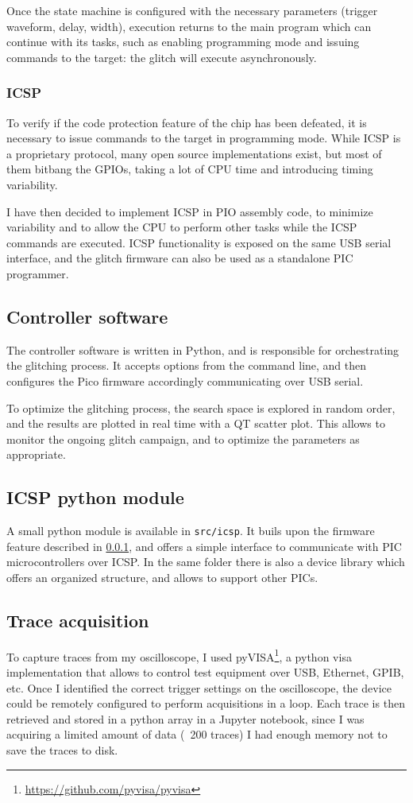 \documentclass[a4paper,english,twoside,10pt]{article}
\begin{document}
Once the state machine is configured with the necessary parameters (trigger waveform, delay, width), execution returns to the main program which can continue with its tasks, such as enabling programming mode and issuing commands to the target: the glitch will execute asynchronously.

\subsubsection{ICSP}\label{sect:icsp}
To verify if the code protection feature of the chip has been defeated, it is necessary to issue commands to the target in programming mode. While ICSP is a proprietary protocol, many open source implementations exist, but most of them bitbang the GPIOs, taking a lot of CPU time and introducing timing variability.

I have then decided to implement ICSP in PIO assembly code, to minimize variability and to allow the CPU to perform other tasks while the ICSP commands are executed. ICSP functionality is exposed on the same USB serial interface, and the glitch firmware can also be used as a standalone PIC programmer.

\subsection{Controller software}
The controller software is written in Python, and is responsible for orchestrating the glitching process. It accepts options from the command line, and then configures the Pico firmware accordingly communicating over USB serial.

To optimize the glitching process, the search space is explored in random order, and the results are plotted in real time with a QT scatter plot. This allows to monitor the ongoing glitch campaign, and to optimize the parameters as appropriate.

\subsection{ICSP python module}
A small python module is available in \texttt{src/icsp}. It buils upon the firmware feature described in \ref{sect:icsp}, and offers a simple interface to communicate with PIC microcontrollers over ICSP. In the same folder there is also a device library which offers an organized structure, and allows to support other PICs.

\subsection{Trace acquisition}\label{sect:traceacquisition}
To capture traces from my oscilloscope, I used pyVISA\footnote{\url{https://github.com/pyvisa/pyvisa}}, a python \gls{visa} implementation that allows to control test equipment over USB, Ethernet, GPIB, etc. Once I identified the correct trigger settings on the oscilloscope, the device could be remotely configured to perform acquisitions in a loop. Each trace is then retrieved and stored in a python array in a Jupyter notebook, since I was acquiring a limited amount of data (~200 traces) I had enough memory not to save the traces to disk.
\end{document}

